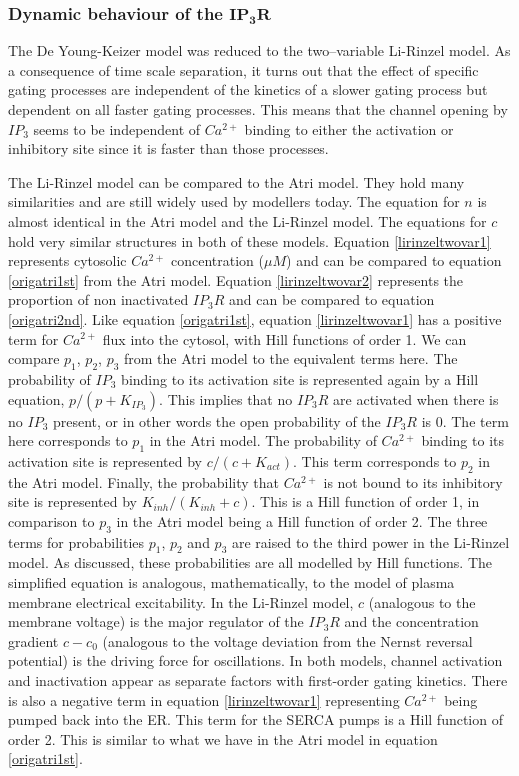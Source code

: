 \subsubsection*{Dynamic behaviour of the $\mathbf{IP_3R}$}
The De Young-Keizer model {was reduced} to the two--variable Li-Rinzel model. As a consequence of time scale separation, it turns out that the effect of specific gating processes are independent of the kinetics of a slower gating process but dependent on all faster gating processes. This means that the channel opening by $IP_3$ seems to be independent of $Ca^{2+}$ binding to either the activation or inhibitory site since it is faster than those processes. 

The Li-Rinzel model can be compared to the Atri model. They hold many similarities and are still widely used by modellers today. The equation for $n$ is almost identical in the Atri model and the Li-Rinzel model. The equations for $c$ hold very similar structures in both of these models. Equation \eqref{lirinzeltwovar1} represents cytosolic $Ca^{2+}$ concentration ($\mu M$) and can be compared to equation \eqref{origatri1st} from the Atri model. Equation \eqref{lirinzeltwovar2} represents the proportion of non inactivated $IP_3R$ and can be compared to equation \eqref{origatri2nd}. Like equation \eqref{origatri1st}, equation \eqref{lirinzeltwovar1} has a positive term for $Ca^{2+}$ flux into the cytosol, with Hill functions of order 1. We can compare $p_1$, $p_2$, $p_3$ from the Atri model to the equivalent terms here. The probability of $IP_3$ binding to its activation site is represented again by a Hill equation, $p/(p+K_{IP_3})$. This implies that no $IP_3R$ are activated when there is no $IP_3$ present, or in other words the open probability of the $IP_3R$ is $0$. The term here corresponds to $p_1$ in the Atri model. The probability of $Ca^{2+}$ binding to its activation site is represented by $c/(c+K_{act})$. This term corresponds to $p_2$ in the Atri model. Finally, the probability that $Ca^{2+}$ is not bound to its inhibitory site is represented by $K_{inh}/(K_{inh}+c)$. This is a Hill function of order 1, in comparison to $p_3$ in the Atri model being a Hill function of order 2. The three terms for probabilities $p_1$, $p_2$ and $p_3$ are raised to the third power in the Li-Rinzel model. As discussed, these probabilities are all modelled by Hill functions. The simplified equation is analogous, mathematically, to the  model of plasma membrane electrical excitability. {In the Li-Rinzel model, $c$ (analogous to the membrane voltage) is the major regulator of the $IP_3R$ and the concentration gradient $c-c_0$ (analogous to the voltage deviation from the Nernst reversal potential) is the driving force for oscillations. In both models, channel activation and inactivation appear as separate factors with first-order gating kinetics.} There is also a negative term in equation \eqref{lirinzeltwovar1} representing $Ca^{2+}$ being pumped back into the ER. This term for the SERCA pumps is a Hill function of order 2. This is similar to what we have in the Atri model in equation \eqref{origatri1st}.

